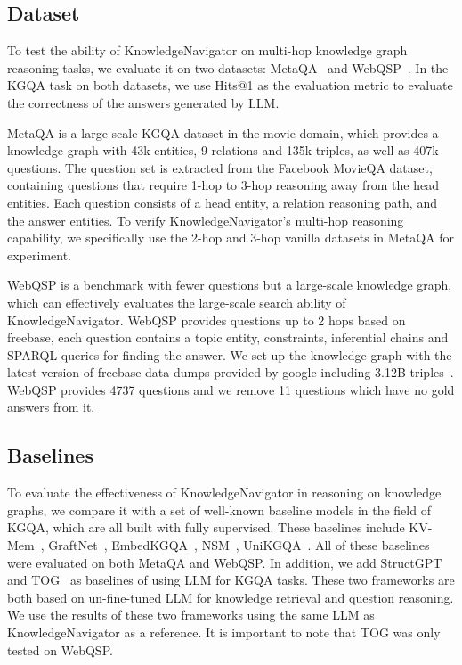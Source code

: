 \documentclass{article}
\begin{document}
\subsection{Dataset}


To test the ability of KnowledgeNavigator on multi-hop knowledge graph reasoning tasks, we evaluate it on two datasets: MetaQA~\cite{MetaQA} and WebQSP~\cite{WebQSP}. In the KGQA task on both datasets, we use Hits@1 as the evaluation metric to evaluate the correctness of the answers generated by LLM.



MetaQA is a large-scale KGQA dataset in the movie domain, which provides a knowledge graph with 43k entities, 9 relations and 135k triples, as well as 407k questions. The question set is extracted from the Facebook MovieQA dataset, containing questions that require 1-hop to 3-hop reasoning away from the head entities. Each question  consists of a head entity, a relation reasoning path, and the answer entities. To verify KnowledgeNavigator's multi-hop reasoning capability, we specifically use the 2-hop and 3-hop vanilla datasets in MetaQA for experiment.

WebQSP is a benchmark with fewer questions but a large-scale knowledge graph, which can effectively evaluates the large-scale search ability of KnowledgeNavigator. WebQSP provides questions up to 2 hops based on freebase, each question contains a topic entity, constraints, inferential chains and SPARQL queries for finding the answer. We set up the knowledge graph with the latest version of freebase data dumps provided by google including 3.12B triples~\cite{freebasedatadumps}. WebQSP provides 4737 questions and we remove 11 questions which have no gold answers from it. 

\subsection{Baselines}


To evaluate the effectiveness of KnowledgeNavigator in reasoning on knowledge graphs, we compare it with a set of well-known baseline models in the field of KGQA, which are all built with fully supervised. These baselines include KV-Mem~\cite{KVMem}, GraftNet~\cite{GraftNet}, EmbedKGQA~\cite{EmbedKGQA}, NSM~\cite{NSM}, UniKGQA~\cite{UniKGQA}. All of these baselines were evaluated on both MetaQA and WebQSP. In addition, we add StructGPT~\cite{structgpt} and TOG~\cite{TOG} as baselines of using LLM for KGQA tasks. These two frameworks are both based on un-fine-tuned LLM for knowledge retrieval and question reasoning. We use the results of these two frameworks using the same LLM as KnowledgeNavigator as a reference. It is important to note that TOG was only tested on WebQSP. 
\end{document}
